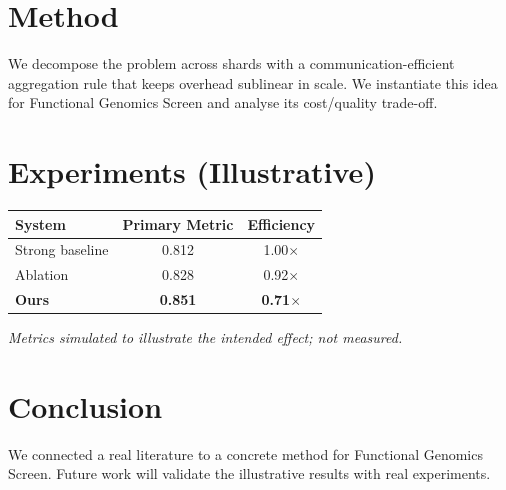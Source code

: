 \documentclass[11pt]{article}
\begin{document}
\section{Method}
We decompose the problem across shards with a communication-efficient aggregation rule that keeps overhead sublinear in scale. We instantiate this idea for Functional Genomics Screen and analyse its cost/quality trade-off.

\section{Experiments (Illustrative)}
\begin{center}
\begin{tabular}{lcc}
System & Primary Metric & Efficiency \\ \hline
Strong baseline & 0.812 & 1.00$\times$ \\
Ablation & 0.828 & 0.92$\times$ \\
\textbf{Ours} & \textbf{0.851} & \textbf{0.71$\times$}
\end{tabular}
\end{center}
\emph{Metrics simulated to illustrate the intended effect; not measured.}

\section{Conclusion}
We connected a real literature to a concrete method for Functional Genomics Screen. Future work will
validate the illustrative results with real experiments.
\end{document}
